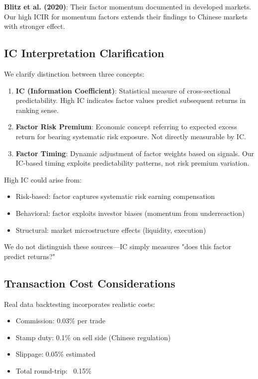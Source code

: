 \textbf{Blitz et al. (2020)}: Their factor momentum documented in developed markets. Our high ICIR for momentum factors extends their findings to Chinese markets with stronger effect.

\subsection{IC Interpretation Clarification}

We clarify distinction between three concepts:

\begin{enumerate}
    \item \textbf{IC (Information Coefficient)}: Statistical measure of cross-sectional predictability. High IC indicates factor values predict subsequent returns in ranking sense.

    \item \textbf{Factor Risk Premium}: Economic concept referring to expected excess return for bearing systematic risk exposure. Not directly measurable by IC.

    \item \textbf{Factor Timing}: Dynamic adjustment of factor weights based on signals. Our IC-based timing exploits predictability patterns, not risk premium variation.
\end{enumerate}

High IC could arise from:
\begin{itemize}
    \item Risk-based: factor captures systematic risk earning compensation
    \item Behavioral: factor exploits investor biases (momentum from underreaction)
    \item Structural: market microstructure effects (liquidity, execution)
\end{itemize}

We do not distinguish these sources---IC simply measures "does this factor predict returns?"

\subsection{Transaction Cost Considerations}

Real data backtesting incorporates realistic costs:
\begin{itemize}
    \item Commission: 0.03\% per trade
    \item Stamp duty: 0.1\% on sell side (Chinese regulation)
    \item Slippage: 0.05\% estimated
    \item Total round-trip: ~0.15\%
\end{itemize}

